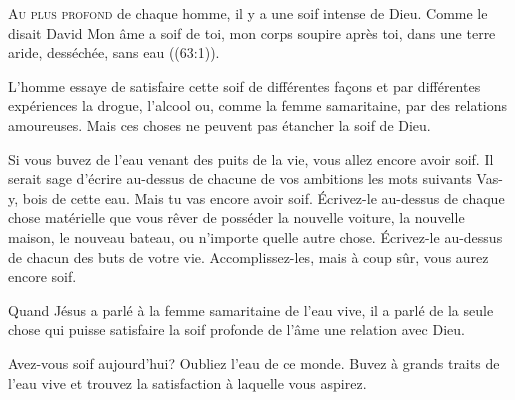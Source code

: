 



\lettrine{A}{u plus profond} de chaque homme,
 il y a une soif intense de Dieu.
 Comme le disait David\frcolon{} 
 \Og Mon âme a soif de toi, mon corps soupire après toi,
 dans une terre aride, desséchée, sans eau \Fg{}
 ((63:1)). 

L'homme essaye de satisfaire cette soif de différentes fa\c{c}ons
 et par différentes expériences \ocadr la drogue, l'alcool ou,
 comme la femme samaritaine, par des relations amoureuses.
 Mais ces choses ne peuvent pas étancher la soif de Dieu.


Si vous buvez de l'eau venant des puits de la vie,
 vous allez encore avoir soif.
 Il serait sage d'écrire au-dessus
 de chacune de vos ambitions les mots suivants\frcolon{}
 \Og Vas-y, bois de cette eau. Mais tu vas encore avoir soif. \Fg{}
 Écrivez-le  au-dessus de chaque chose matérielle
 que vous rêver de posséder \ocadr la nouvelle voiture, la nouvelle maison,
 le nouveau bateau, ou n'importe quelle autre chose.
 Écrivez-le au-dessus de chacun des buts de votre vie.
 Accomplissez-les, mais à coup sûr, vous aurez encore soif.

Quand Jésus a parlé à la femme samaritaine de l'eau vive,
 il a parlé de la seule chose qui puisse satisfaire
 la soif profonde de l'âme \ocadr une relation avec Dieu.

Avez-vous soif aujourd'hui? Oubliez l'eau de ce monde.
 Buvez à grands traits de l'eau vive et trouvez la satisfaction
 à laquelle vous aspirez.

\dvrule





